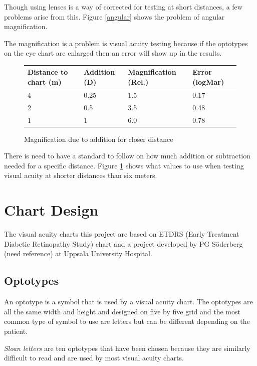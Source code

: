 \documentclass[12pt,a4paper,notitlepage]{report}
\begin{document}
Though using lenses is a way of corrected for testing at short distances, a few problems arise from this. Figure \ref{angular} shows the problem of angular magnification. 

The magnification is a problem is visual acuity testing because if the optotypes on the eye chart are enlarged then an error will show up in the results.

\newpage
\begin{figure}[h]
\centering
\begin{tabular}{| l | l | l | l |}
    \hline
    Distance to chart (m) & Addition (D) & Magnification (Rel.) & Error (logMar) \\ \hline
    4                     & 0.25         & 1.5                  & 0.17           \\ \hline
    2                     & 0.5          & 3.5                  & 0.48           \\ \hline
    1                     & 1            & 6.0                  & 0.78           \\ 
    \hline
    \end{tabular}
    \caption{Magnification due to addition for closer distance\label{magtable}}
\end{figure}

There is need to have a standard to follow on how much addition or subtraction needed for a specific distance. Figure \ref{magtable} shows what values to use when testing visual acuity at shorter distances than six meters. \cite{PGSoderberg}

\section{Chart Design}
The visual acuity charts this project are based on ETDRS (Early Treatment Diabetic Retinopathy Study) chart\cite{Ferris} and a project developed by PG Söderberg (need reference) at Uppsala University Hospital. 

\subsection{Optotypes}
An optotype is a symbol that is used by a visual acuity chart. The optotypes are all the same width and height and designed on five by five grid and the most common type of symbol to use are letters but can be different depending on the patient\cite{Colenbrander}.

\textit{Sloan letters} are ten optotypes that have been chosen because they are similarly difficult to read\cite{Ferris} and are used by most visual acuity charts\cite{Colenbrander}.
\end{document}
